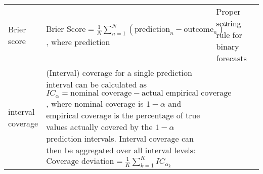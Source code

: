 \begin{sidewaystable}[]
\begin{tabularx}{\linewidth}{|X|X|X|X|}
Brier score                                                             & $\text{Brier Score} = \frac{1}{N} \sum_{n = 1}^{N} (\text{prediction}_n - \text{outcome}_n)^2$, where prediction                                                                                                                                                                                                                                                                                                                                                                                                                                                                                                                                                                                                                                                                                                                                                                                                & Proper scoring rule for binary forecasts                                                                                                                                                                                                                                                                                                                                                                                                       &                                                                                                                                                                \\
interval coverage                                                       & (Interval) coverage for a single prediction interval can be calculated as $IC_\alpha = \text{nominal coverage} - \text{actual empirical coverage}$, where nominal coverage is $1 - \alpha$ and empirical coverage is the percentage of true values actually covered by the $1 - \alpha$ prediction intervals. Interval coverage can then be aggregated over all interval levels: $\text{Coverage deviation} = \frac{1}{K} \sum_{k = 1}^{K} IC_{\alpha_k}$                                                                                                                                                                                                                                                                                                                                                                                                                                                         &                                                                                                                                                                                                                                                                                                                                                                                                                                                &                                                                                                                                                                \\





\end{tabularx}
\end{sidewaystable}
